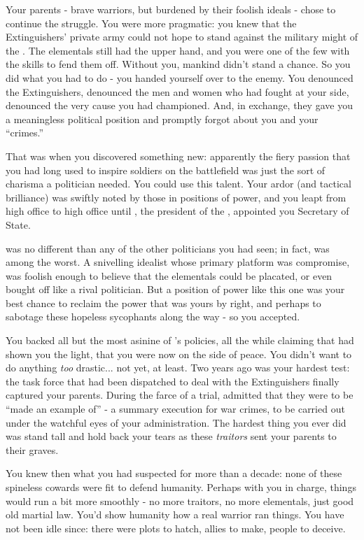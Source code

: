 \documentclass[char]{elementals}
\begin{document}
Your parents - brave warriors, but burdened by their foolish ideals - chose to continue the struggle. You were more pragmatic: you knew that the Extinguishers' private army could not hope to stand against the military might of the \cNewUN{\intro{}}. The elementals still had the upper hand, and you were one of the few with the skills to fend them off. Without you, mankind didn't stand a chance. So you did what you had to do - you handed yourself over to the enemy. You denounced the Extinguishers, denounced the men and women who had fought at your side, denounced the very cause you had championed. And, in exchange, they gave you a meaningless political position and promptly forgot about you and your ``crimes.''

That was when you discovered something new: apparently the fiery passion that you had long used to inspire soldiers on the battlefield was just the sort of charisma a politician needed. You could use this talent. Your ardor (and tactical brilliance) was swiftly noted by those in positions of power, and you leapt from high office to high office until \cLeader{\intro{}} \cLeader{\themself}, the president of the \cNewUN{\intro}, appointed you \cLeader{\their} Secretary of State.

\cLeader{} was no different than any of the other politicians you had seen; in fact, \cLeader{\they} was among the worst. A snivelling idealist whose primary platform was compromise, \cLeader{\they} was foolish enough to believe that the elementals could be placated, or even bought off like a rival politician. But a position of power like this one was your best chance to reclaim the power that was yours by right, and perhaps to sabotage these hopeless sycophants along the way - so you accepted. 

You backed all but the most asinine of \cLeader{}'s policies, all the while claiming that \cLeader{\they} had shown you the light, that you were now on the side of peace. You didn't want to do anything \emph{too} drastic... not yet, at least. Two years ago was your hardest test: the task force that had been dispatched to deal with the Extinguishers finally captured your parents. During the farce of a trial, \cLeader{} admitted that they were to be ``made an example of'' - a summary execution for war crimes, to be carried out under the watchful eyes of your administration. The hardest thing you ever did was stand tall and hold back your tears as these \emph{traitors} sent your parents to their graves.

You knew then what you had suspected for more than a decade: none of these spineless cowards were fit to defend humanity. Perhaps with you in charge, things would run a bit more smoothly - no more traitors, no more elementals, just good old martial law. You'd show humanity how a real warrior ran things. You have not been idle since: there were plots to hatch, allies to make, people to deceive. 
\end{document}
